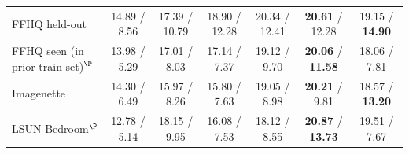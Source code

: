 \begin{table}[t]
\begin{tabular}{@{}lcccccc@{}}
        \midrule
        FFHQ held-out & 14.89 / 8.56 & 17.39 / 10.79 & 18.90 / 12.28 & 20.34 / 12.41 & \textbf{20.61} / 12.28 & 19.15 / \textbf{14.90} \\
        FFHQ seen (in prior train set)$^\P$ & 13.98 / 5.29 & 17.01 / 8.03  & 17.14 / 7.37  & 19.12 / 9.70  & \textbf{20.06} / \textbf{11.58} & 18.06 / 7.81 \\
        Imagenette    & 14.30 / 6.49 & 15.97 / 8.26  & 15.80 / 7.63  & 19.05 / 8.98  & \textbf{20.21} / 9.81 & 18.57 / \textbf{13.20} \\
        LSUN Bedroom$^\P$ & 12.78 / 5.14 & 18.15 / 9.95  & 16.08 / 7.53  & 18.12 / 8.55  & \textbf{20.87} / \textbf{13.73} & 19.51 / 7.67 \\
        \bottomrule
    \end{tabular}
\end{table}

